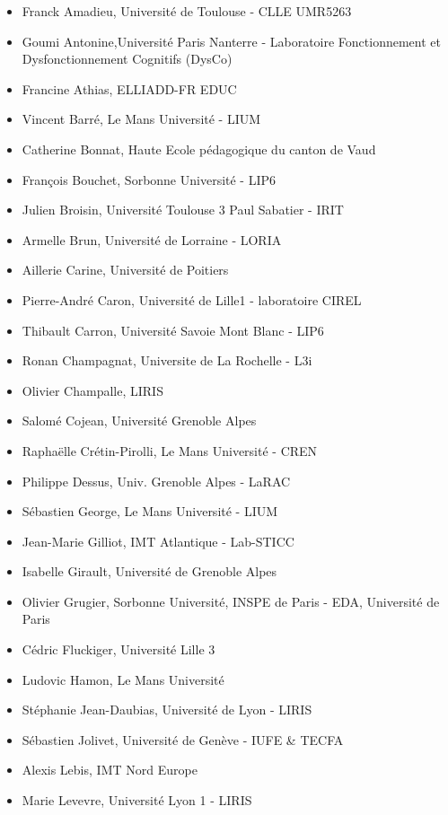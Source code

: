 \begin{itemize}
	\item[] Franck Amadieu, Université de Toulouse - CLLE UMR5263
	\item[] Goumi Antonine,Université Paris Nanterre -  Laboratoire Fonctionnement et Dysfonctionnement Cognitifs (DysCo)
	\item[] Francine Athias, ELLIADD-FR EDUC
	\item[] Vincent Barré, Le Mans Université - LIUM
	\item[] Catherine Bonnat, Haute Ecole pédagogique du canton de Vaud
	\item[] François Bouchet, Sorbonne Université - LIP6
	\item[] Julien Broisin, Université Toulouse 3 Paul Sabatier - IRIT
	\item[] Armelle Brun, Université de Lorraine - LORIA
	\item[] Aillerie Carine, Université de Poitiers
	\item[] Pierre-André Caron, Université de Lille1 - laboratoire CIREL
	\item[] Thibault Carron, Université Savoie Mont Blanc - LIP6
	\item[] Ronan Champagnat, Universite de La Rochelle - L3i
	\item[] Olivier Champalle, LIRIS
	\item[] Salomé Cojean, Université Grenoble Alpes
	\item[] Raphaëlle Crétin-Pirolli, Le Mans Université - CREN
	\item[] Philippe Dessus, Univ. Grenoble Alpes - LaRAC
	\item[] Sébastien George, Le Mans Université - LIUM
	\item[] Jean-Marie Gilliot, IMT Atlantique - Lab-STICC
	\item[] Isabelle Girault, Université de Grenoble Alpes
	\item[] Olivier Grugier, Sorbonne Université, INSPE de Paris - EDA, Université de Paris
	\item[] Cédric Fluckiger, Université Lille 3
	\item[] Ludovic Hamon, Le Mans Université
	\item[] Stéphanie Jean-Daubias, Université de Lyon - LIRIS
	\item[] Sébastien Jolivet, Université de Genève - IUFE \& TECFA
	\item[] Alexis Lebis, IMT Nord Europe
	\item[] Marie Levevre, Université Lyon 1 - LIRIS

\end{itemize}
